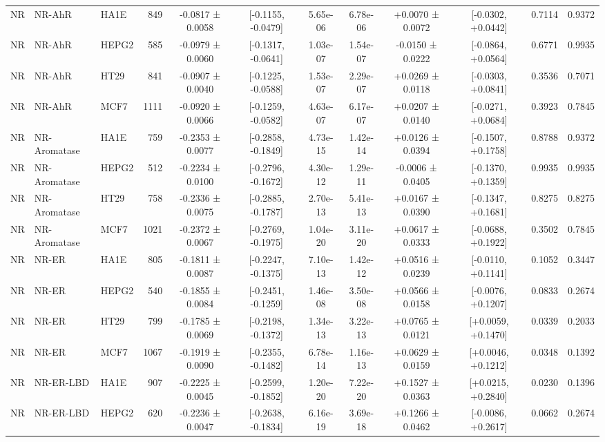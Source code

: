 \begin{landscape}
\begin{longtable}{lll r cc cc cc cc}
\addlinespace[1.5pt]
NR & NR-AhR & HA1E & 849 & -0.0817 ± 0.0058 & [-0.1155, -0.0479] & 5.65e-06 & 6.78e-06 & +0.0070 ± 0.0072 & [-0.0302, +0.0442] & 0.7114 & 0.9372 \\
NR & NR-AhR & HEPG2 & 585 & -0.0979 ± 0.0060 & [-0.1317, -0.0641] & 1.03e-07 & 1.54e-07 & -0.0150 ± 0.0222 & [-0.0864, +0.0564] & 0.6771 & 0.9935 \\
NR & NR-AhR & HT29 & 841 & -0.0907 ± 0.0040 & [-0.1225, -0.0588] & 1.53e-07 & 2.29e-07 & +0.0269 ± 0.0118 & [-0.0303, +0.0841] & 0.3536 & 0.7071 \\
NR & NR-AhR & MCF7 & 1111 & -0.0920 ± 0.0066 & [-0.1259, -0.0582] & 4.63e-07 & 6.17e-07 & +0.0207 ± 0.0140 & [-0.0271, +0.0684] & 0.3923 & 0.7845 \\
\addlinespace[1.5pt]
NR & NR-Aromatase & HA1E & 759 & -0.2353 ± 0.0077 & [-0.2858, -0.1849] & 4.73e-15 & 1.42e-14 & +0.0126 ± 0.0394 & [-0.1507, +0.1758] & 0.8788 & 0.9372 \\
NR & NR-Aromatase & HEPG2 & 512 & -0.2234 ± 0.0100 & [-0.2796, -0.1672] & 4.30e-12 & 1.29e-11 & -0.0006 ± 0.0405 & [-0.1370, +0.1359] & 0.9935 & 0.9935 \\
NR & NR-Aromatase & HT29 & 758 & -0.2336 ± 0.0075 & [-0.2885, -0.1787] & 2.70e-13 & 5.41e-13 & +0.0167 ± 0.0390 & [-0.1347, +0.1681] & 0.8275 & 0.8275 \\
NR & NR-Aromatase & MCF7 & 1021 & -0.2372 ± 0.0067 & [-0.2769, -0.1975] & 1.04e-20 & 3.11e-20 & +0.0617 ± 0.0333 & [-0.0688, +0.1922] & 0.3502 & 0.7845 \\
\addlinespace[1.5pt]
NR & NR-ER & HA1E & 805 & -0.1811 ± 0.0087 & [-0.2247, -0.1375] & 7.10e-13 & 1.42e-12 & +0.0516 ± 0.0239 & [-0.0110, +0.1141] & 0.1052 & 0.3447 \\
NR & NR-ER & HEPG2 & 540 & -0.1855 ± 0.0084 & [-0.2451, -0.1259] & 1.46e-08 & 3.50e-08 & +0.0566 ± 0.0158 & [-0.0076, +0.1207] & 0.0833 & 0.2674 \\
NR & NR-ER & HT29 & 799 & -0.1785 ± 0.0069 & [-0.2198, -0.1372] & 1.34e-13 & 3.22e-13 & +0.0765 ± 0.0121 & [+0.0059, +0.1470] & 0.0339 & 0.2033 \\
NR & NR-ER & MCF7 & 1067 & -0.1919 ± 0.0090 & [-0.2355, -0.1482] & 6.78e-14 & 1.16e-13 & +0.0629 ± 0.0159 & [+0.0046, +0.1212] & 0.0348 & 0.1392 \\
\addlinespace[1.5pt]
NR & NR-ER-LBD & HA1E & 907 & -0.2225 ± 0.0045 & [-0.2599, -0.1852] & 1.20e-20 & 7.22e-20 & +0.1527 ± 0.0363 & [+0.0215, +0.2840] & 0.0230 & 0.1396 \\
NR & NR-ER-LBD & HEPG2 & 620 & -0.2236 ± 0.0047 & [-0.2638, -0.1834] & 6.16e-19 & 3.69e-18 & +0.1266 ± 0.0462 & [-0.0086, +0.2617] & 0.0662 & 0.2674 \\

\end{longtable}
\end{landscape}
